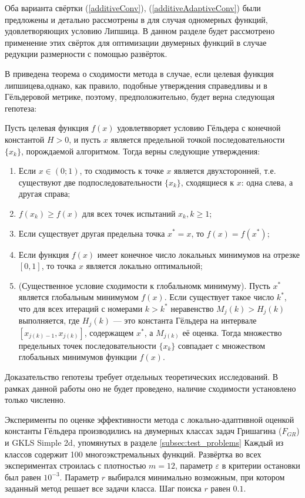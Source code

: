 Оба варианта свёртки (\ref{additiveConv}), (\ref{additiveAdaptiveConv}) были предложены
и детально рассмотрены в \cite{sergLocalTuning} для случая одномерных функций,
удовлетворяющих условию Липшица. В данном разделе будет рассмотрено применение этих
свёрток для оптимизации двумерных функций в случае редукции размерности с помощью развёрток.

В \cite{sergLocalTuning} приведена теорема о сходимости метода в случае, если целевая функция
липшицева,однако, как правило, подобные утверждения справедливы и в Гёльдеровой метрике, поэтому,
предположительно, будет верна следующая гепотеза:
\begin{hypothesis}
Пусть целевая функция \(f(x)\) удовлетвворяет условию Гёльдера с конечной константой
\(H > 0\), и пусть \(x\) является предельной точкой последовательности \(\{x_k\}\),
порождаемой алгоритмом. Тогда верны следующие утверждения:
\begin{enumerate}
  \item Если \(x\in(0;1)\), то сходимость к точке \(x\) является двухсторонней, т.е.
  существуют две подпоследовательности \(\{x_k\}\), сходящиеся к \(x\): одна слева,
  а другая справа;
  \item \(f(x_k) \geqslant f(x)\) для всех точек испытаний \(x_k, k \geqslant 1\);
  \item Если существует другая предельна точка \(x^* = x\), то \(f(x) = f(x^*)\);
  \item Если функция \(f(x)\) имеет конечное число локальных минимумов на отрезке \([0, 1]\),
  то точка \(x\) является локально оптимальной;
  \item (Существенное условие сходимости к глобальномк минимуму). Пусть \(x^*\)
  является глобальным минимумом \(f(x)\). Если существует такое число \(k^*\),
  что для всех итераций с номерами \(k > k^*\) неравенство
  \(M_j(k) > H_j(k)\) выполняется, где \(H_j(k)\) --- это константа Гёльдера на интервале
  \([x_{j(k)-1}, x_{j(k)}]\), содержащем \(x^*\), а \(M_{j(k)}\) её оценка.
  Тогда множество предельных точек последовательности \(\{x_k\}\) совпадает с множеством
  глобальных минимумов функции \(f(x)\).
\end{enumerate}
\end{hypothesis}

Доказательство гепотезы требует отдельных теоретических исследований. В рамках данной
работы оно не будет проведено, наличие сходимости установлено только численно.

Эксперименты по оценке эффективности метода с локально-адаптивной оценкой константы
Гёльдера производились на двумерных классах задач Гришагина (\(F_{GR}\))
и GKLS Simple 2d, упомянутых в разделе \ref{subsec:test_problems}
Каждый из классов содержит 100 многоэкстремальных функций. Развёртка во всех экспериментах
строилась с плотностью \(m=12\), параметр \(\varepsilon\) в критерии остановки был равен \(10^{-3}\).
Параметр \(r\) выбирался минимально возможным, при котором заданный метод решает все
задачи класса. Шаг поиска \(r\) равен \(0.1\).

